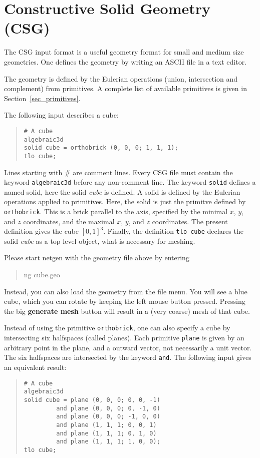 \documentclass[12pt]{book}
\begin{document}
\chapter{Constructive Solid Geometry (CSG)}
\label{chap_csg}
%
The CSG input format is a useful geometry format for small and
medium size geometries. One defines the geometry by writing an
ASCII file in a text editor.

The geometry is defined by the Eulerian operations (union,
intersection and complement) from primitives. A complete list of
available primitives is given in Section~\ref{sec_primitives}.

The following input describes a cube:
\begin{quote}
\begin{verbatim}
# A cube
algebraic3d
solid cube = orthobrick (0, 0, 0; 1, 1, 1);
tlo cube;
\end{verbatim}
\end{quote}
Lines starting with $\#$ are comment lines. Every CSG file must contain the
keyword {\tt algebraic3d} before any non-comment line.
The keyword {\tt solid} defines a named solid, here the solid {\it cube}
is defined. A solid is defined by the Eulerian operations applied to 
primitives. Here, the solid is just the primitve defined by {\tt orthobrick}.
This is a brick parallel to the axis, specified by the minimal $x$, $y$, and
$z$ coordinates, and the maximal $x$, $y$, and $z$ coordinates. The present
definition gives the cube $[0,1]^3$. Finally, the definition {\tt tlo cube}
declares the solid {\it cube} as a top-level-object, what is necessary for
meshing.

Please start netgen with the geometry file above by entering
\begin{quote}
ng cube.geo
\end{quote}
Instead, you can also load the geometry from the file menu. You will
see a blue cube, which you can rotate by keeping the left mouse button
pressed. Pressing the big {\bf generate mesh} button will result in a
(very coarse) mesh of that cube. 

Instead of using the primitive {\tt orthobrick}, one can also specify
a cube by intersecting six halfspaces (called planes). Each primitive
{\tt plane} is given by an arbitrary point in the plane, and a outward
vector, not necessarily a unit vector. The six halfspaces are intersected
by the keyword {\tt and}. The following input gives an equivalent result:

\begin{quote}
\begin{verbatim}
# A cube
algebraic3d
solid cube = plane (0, 0, 0; 0, 0, -1) 
         and plane (0, 0, 0; 0, -1, 0)
         and plane (0, 0, 0; -1, 0, 0)
         and plane (1, 1, 1; 0, 0, 1)
         and plane (1, 1, 1; 0, 1, 0)
         and plane (1, 1, 1; 1, 0, 0);
tlo cube;
\end{verbatim}
\end{quote}
\end{document}
